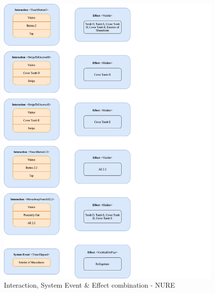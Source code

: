\begin{figure}[h]
	\centering
	\includegraphics[width=14cm]{Figures/Conceptual Model/IM_NURE.png}
	\caption{Interaction, System Event \& Effect combination - NURE}
	\label{fig:IM1NURE}
\end{figure}
